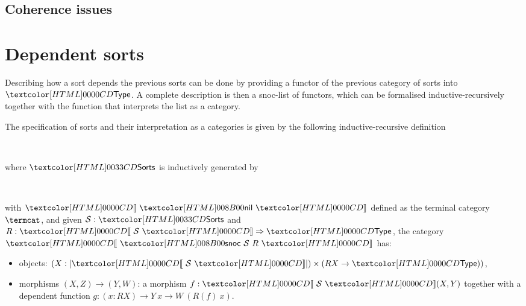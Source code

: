 \subsection{Coherence issues}


\section{Dependent sorts}

Describing how a sort depends the previous sorts can be done by
providing a functor of the previous category of sorts into $\Type$. A
complete description is then a snoc-list of functors, which can be
formalised inductive-recursively together with the function that
interprets the list as a category.
% 
\begin{definition}
  The specification of sorts and their interpretation as a
  categories is given by the following inductive-recursive
  definition
  \begin{sorts}
    \sortname{\sortsty}{\Type} \\
    \functy{\SortCat{\_}}{\sortsty \to \Cat}
  \end{sorts}
  where $\sortsty$ is inductively generated by
  \begin{datatype}{\sortsty}{}
    \constr{\sortsnil}{\sortsty} \\
    \constr{\sortssnoc}{(\Ss : \sortsty) \to (\Func{\SortCat{\Ss}}{\Type}) \to \sortsty}
  \end{datatype}
  with $\SortCat{\sortsnil}$ defined as the terminal category $\termcat$, and given
  $\Ss : \sortsty$ and $R : \Func{\SortCat{\Ss}}{\Type}$,
  the category $\SortCat{\sortssnoc\ \Ss\ R}$ has:
  \begin{itemize}
  \item objects: $(X : | \SortCat{\Ss} |) \times (R X \to \Type))$,
  \item morphisms $(X,Z) \to (Y,W)$: a morphism $f : \SortCat{\Ss}(X,Y)$
    together with a dependent function $g : (x : R X) \to Y\ x \to W\ (R(f)\ x)$.
  \end{itemize}
\end{definition}


